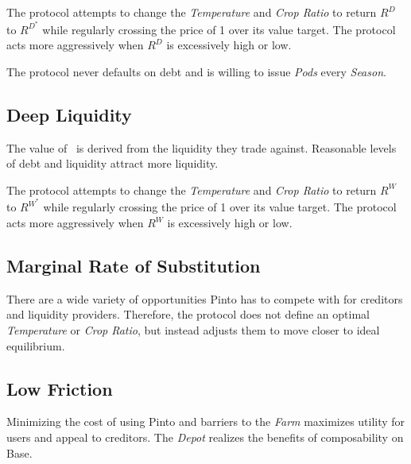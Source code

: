 \documentclass[tikz]{article}
\newcommand{\term}[1]{\textsl{#1}}
\newcommand{\Pinto}{} %
\begin{document}
The protocol attempts to change the \term{Temperature} and \term{Crop Ratio} to return $R^{D}$ to $R^{D^{*}}$ while regularly crossing the price of \Pinto1 over its value target. The protocol acts more aggressively when $R^{D}$ is excessively high or low.

\vspace{0.1cm}

The protocol never defaults on debt and is willing to issue \term{Pods} every \term{Season}. 


\vspace{0.1cm}
\subsection{Deep Liquidity}
\vspace{0.1cm}

The value of \Pinto\ is derived from the liquidity they trade against. Reasonable levels of debt and liquidity attract more liquidity. 

\vspace{0.1cm}

The protocol attempts to change the \term{Temperature} and \term{Crop Ratio} to return $R^{W}$ to $R^{W^{*}}$ while regularly crossing the price of \Pinto1 over its value target. The protocol acts more aggressively when $R^{W}$ is excessively high or low.

\newpage


\subsection{Marginal Rate of Substitution}

There are a wide variety of opportunities Pinto has to compete with for creditors and liquidity providers. Therefore, the protocol does not define an optimal \term{Temperature} or \term{Crop Ratio}, but instead adjusts them to move closer to ideal equilibrium. 


\subsection{Low Friction}

Minimizing the cost of using Pinto and barriers to the \term{Farm} maximizes utility for users and appeal to creditors. The \term{Depot} realizes the benefits of composability on Base.
\end{document}

